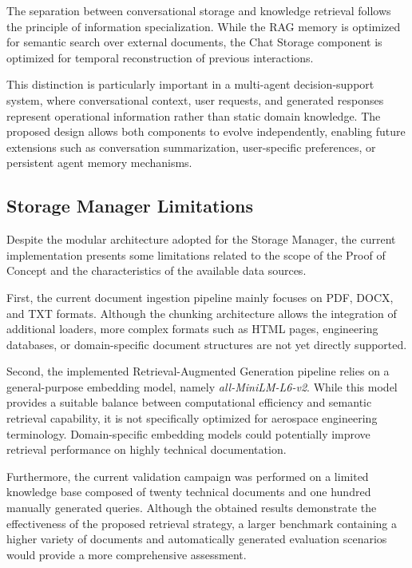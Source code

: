 The separation between conversational storage and knowledge retrieval follows the principle of information specialization. While the RAG memory is optimized for semantic search over external documents, the Chat Storage component is optimized for temporal reconstruction of previous interactions.

This distinction is particularly important in a multi-agent decision-support system, where conversational context, user requests, and generated responses represent operational information rather than static domain knowledge. The proposed design allows both components to evolve independently, enabling future extensions such as conversation summarization, user-specific preferences, or persistent agent memory mechanisms.


\subsection{Storage Manager Limitations}

Despite the modular architecture adopted for the Storage Manager, the current implementation presents some limitations related to the scope of the Proof of Concept and the characteristics of the available data sources.

First, the current document ingestion pipeline mainly focuses on PDF, DOCX, and TXT formats. Although the chunking architecture allows the integration of additional loaders, more complex formats such as HTML pages, engineering databases, or domain-specific document structures are not yet directly supported.

Second, the implemented Retrieval-Augmented Generation pipeline relies on a general-purpose embedding model, namely \textit{all-MiniLM-L6-v2}. While this model provides a suitable balance between computational efficiency and semantic retrieval capability, it is not specifically optimized for aerospace engineering terminology. Domain-specific embedding models could potentially improve retrieval performance on highly technical documentation.

Furthermore, the current validation campaign was performed on a limited knowledge base composed of twenty technical documents and one hundred manually generated queries. Although the obtained results demonstrate the effectiveness of the proposed retrieval strategy, a larger benchmark containing a higher variety of documents and automatically generated evaluation scenarios would provide a more comprehensive assessment.

